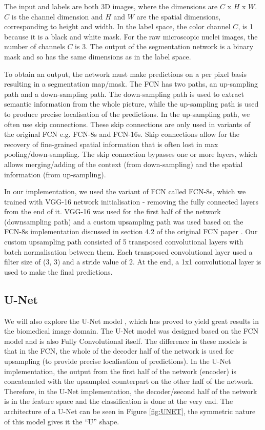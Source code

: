 \documentclass{article}
\begin{document}
The input and labels are both 3D images, where the dimensions are $C$ x $H$ x $W$. $C$ is the channel dimension and $H$ and $W$ are the spatial dimensions, corresponding to height and width. In the label space, the color channel $C$, is 1 because it is a black and white mask. For the raw microscopic nuclei images, the number of channels $C$ is 3. The output of the segmentation network is a binary mask and so has the same dimensions as in the label space.

To obtain an output, the network must make predictions on a per pixel basis resulting in a segmentation map/mask. The FCN has two paths, an up-sampling path and a down-sampling path. The down-sampling path is used to extract semantic information from the whole picture, while the up-sampling path is used to produce precise localisation of the predictions. In the up-sampling path, we often use skip connections. These skip connections are only used in variants of the original FCN e.g. FCN-8s and FCN-16s. Skip connections allow for the recovery of fine-grained spatial information that is often lost in max pooling/down-sampling. The skip connection bypasses one or more layers, which allows merging/adding of the context (from down-sampling) and the spatial information (from up-sampling).

In our implementation, we used the variant of FCN called FCN-8s, which we trained with VGG-16 network initialisation - removing the fully connected layers from the end of it. VGG-16 was used for the first half of the network (downsampling path) and a custom upsampling path was used based on the FCN-8s implementation discussed in section 4.2 of the original FCN paper \cite{Long2015FullyCN}. Our custom upsampling path consisted of 5 transposed convolutional layers with batch normalisation between them. Each transposed convolutional layer used a filter size of (3, 3) and a stride value of 2. At the end, a 1x1 convolutional layer is used to make the final predictions.

\subsection{U-Net}
We will also explore the U-Net model \cite{Ronneberger2015UNetCN}, which has proved to yield great results in the biomedical image domain. The U-Net model was designed based on the FCN model \cite{Long2015FullyCN} and is also Fully Convolutional itself. The difference in these models is that in the FCN, the whole of the decoder half of the network is used for upsampling (to provide precise localisation of predictions). In the U-Net implementation, the output from the first half of the network (encoder) is concatenated with the upsampled counterpart on the other half of the network. Therefore, in the U-Net implementation, the decoder/second half of the network is in the feature space and the classification is done at the very end. The architecture of a U-Net can be seen in Figure \ref{fig:UNET}, the symmetric nature of this model gives it the ``U'' shape.
\end{document}
